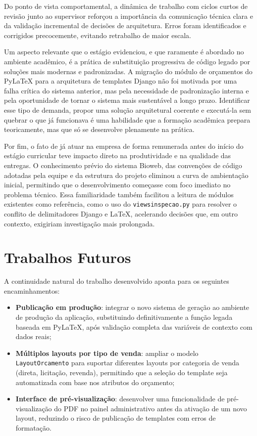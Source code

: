 Do ponto de vista comportamental, a dinâmica de trabalho com ciclos curtos de revisão junto ao
supervisor reforçou a importância da comunicação técnica clara e da validação incremental de decisões
de arquitetura. Erros foram identificados e corrigidos precocemente, evitando retrabalho de maior
escala.

Um aspecto relevante que o estágio evidenciou, e que raramente é abordado no ambiente acadêmico,
é a prática de substituição progressiva de código legado por soluções mais modernas e padronizadas.
A migração do módulo de orçamentos do PyLaTeX para a arquitetura de templates Django não foi motivada
por uma falha crítica do sistema anterior, mas pela necessidade de padronização interna e pela
oportunidade de tornar o sistema mais sustentável a longo prazo. Identificar esse tipo de demanda,
propor uma solução arquitetural coerente e executá-la sem quebrar o que já funcionava é uma habilidade
que a formação acadêmica prepara teoricamente, mas que só se desenvolve plenamente na prática.

Por fim, o fato de já atuar na empresa de forma remunerada antes do início do estágio
curricular teve impacto direto na produtividade e na qualidade das entregas. O conhecimento prévio
do sistema Bioweb, das convenções de código adotadas pela equipe e da estrutura do projeto eliminou
a curva de ambientação inicial, permitindo que o desenvolvimento começasse com foco imediato no
problema técnico. Essa familiaridade também facilitou a leitura de módulos existentes como referência, como o uso do \texttt{viewsinspecao.py} para resolver o conflito de delimitadores Django e
\LaTeX{}, acelerando decisões que, em outro contexto, exigiriam investigação mais prolongada.

\section{Trabalhos Futuros}
\label{sec:trabalhos-futuros}

A continuidade natural do trabalho desenvolvido aponta para os seguintes encaminhamentos:

\begin{itemize}
    \item \textbf{Publicação em produção}: integrar o novo sistema de geração ao ambiente de produção
    da aplicação, substituindo definitivamente a função legada baseada em PyLaTeX, após validação
    completa das variáveis de contexto com dados reais;
    \item \textbf{Múltiplos layouts por tipo de venda}: ampliar o modelo \texttt{LayoutOrcamento} para
    suportar diferentes layouts por categoria de venda (direta, licitação, revenda), permitindo que a
    seleção do template seja automatizada com base nos atributos do orçamento;
    \item \textbf{Interface de pré-visualização}: desenvolver uma funcionalidade de pré-visualização
    do PDF no painel administrativo antes da ativação de um novo layout, reduzindo o risco de
    publicação de templates com erros de formatação.
\end{itemize}